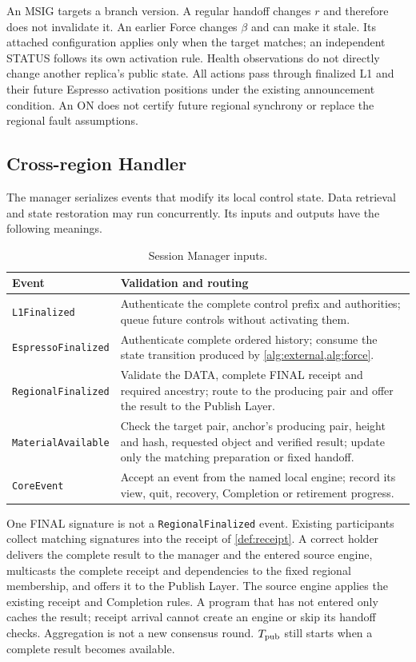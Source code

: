 \documentclass[11pt,a4paper]{article}
\begin{document}
An MSIG targets a branch version. A regular handoff changes $r$ and
therefore does not invalidate it. An earlier Force changes $\beta$ and
can make it stale. Its attached configuration applies only when the
target matches; an independent STATUS follows its own activation rule.
Health observations do not directly change another replica's public
state. All actions pass through finalized L1 and their future Espresso
activation positions under the existing announcement condition.
An ON does not certify future regional synchrony or replace the
regional fault assumptions.

\subsection{Cross-region Handler}
\label{sec:session-manager}
The manager serializes events that modify its local control state.
Data retrieval and state restoration may run concurrently. Its
inputs and outputs have the following meanings.

\begin{table}[htbp]\centering\small
\caption{Session Manager inputs.}
\label{tab:manager-inputs}
\begin{tabularx}{\linewidth}{@{}>{\raggedright\arraybackslash}p{.24\linewidth}Y@{}}\toprule
Event & Validation and routing\\\midrule
\texttt{L1Finalized} & Authenticate the complete control prefix and
authorities; queue future controls without activating them.\\
\texttt{EspressoFinalized} & Authenticate complete ordered history;
consume the state transition produced by \cref{alg:external,alg:force}.\\
\texttt{RegionalFinalized} & Validate the DATA, complete FINAL receipt
and required ancestry; route to the producing pair and offer the result
to the Publish Layer.\\
\texttt{MaterialAvailable} & Check the target pair, anchor's producing
pair, height and hash, requested object and verified result; update only
the matching preparation or fixed handoff.\\
\texttt{CoreEvent} & Accept an event from the named local engine;
record its view, quit, recovery, Completion or retirement progress.\\\bottomrule
\end{tabularx}
\end{table}

One FINAL signature is not a \texttt{RegionalFinalized} event. Existing
participants collect matching signatures into the receipt of
\cref{def:receipt}. A correct holder delivers the complete result to
the manager and the entered source engine, multicasts the complete
receipt and dependencies to the fixed regional membership, and offers
it to the Publish Layer. The source engine applies the existing receipt and Completion
rules. A program that has not entered only caches the result; receipt
arrival cannot create an engine or skip its handoff checks. Aggregation
is not a new consensus round. $T_{\rm pub}$ still starts when a complete
result becomes available.
\end{document}
